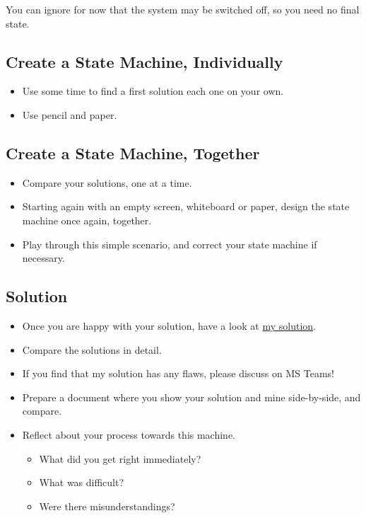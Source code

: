 \documentclass[10pt, twoside, twocolumn]{book}
\providecommand{\tightlist}{%
  \setlength{\itemsep}{0pt}\setlength{\parskip}{0pt}}
\begin{document}
You can ignore for now that the system may be switched off, so you need
no final state.

\hypertarget{create-a-state-machine-individually}{%
\subsection{Create a State Machine,
Individually}\label{create-a-state-machine-individually}}

\begin{itemize}
\tightlist
\item
  Use some time to find a first solution each one on your own.
\item
  Use pencil and paper.
\end{itemize}

\hypertarget{create-a-state-machine-together}{%
\subsection{Create a State Machine,
Together}\label{create-a-state-machine-together}}

\begin{itemize}
\tightlist
\item
  Compare your solutions, one at a time.
\item
  Starting again with an empty screen, whiteboard or paper, design the
  state machine once again, together.
\item
  Play through this simple scenario, and correct your state machine if
  necessary.
\end{itemize}

\hypertarget{solution}{%
\subsection{Solution}\label{solution}}

\begin{itemize}
\tightlist
\item
  Once you are happy with your solution, have a look at
  \href{files/bus-stop.pdf}{my solution}.
\item
  Compare the solutions in detail.
\item
  If you find that my solution has any flaws, please discuss on MS
  Teams!
\item
  Prepare a document where you show your solution and mine side-by-side,
  and compare.
\item
  Reflect about your process towards this machine.

  \begin{itemize}
  \tightlist
  \item
    What did you get right immediately?
  \item
    What was difficult?
  \item
    Were there misunderstandings?
  \end{itemize}
\end{itemize}
\end{document}
